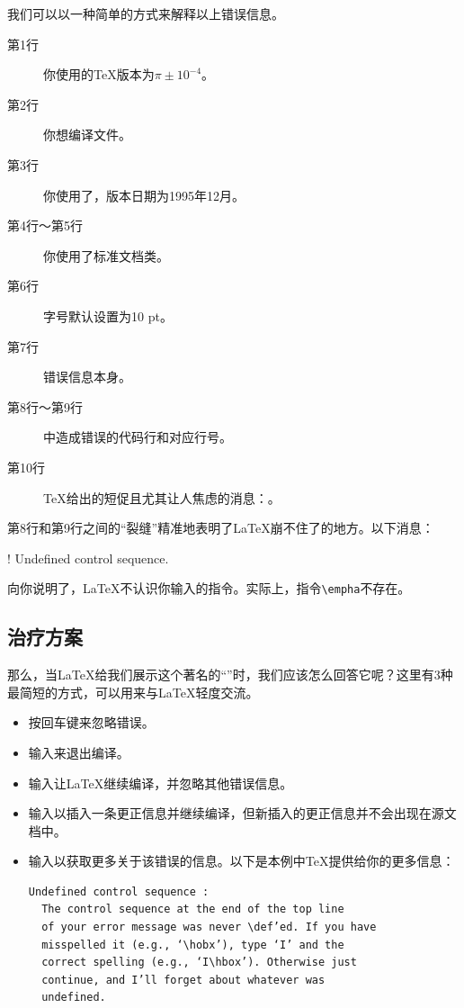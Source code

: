 我们可以以一种简单的方式来解释以上错误信息。

\begin{description}

\item[第1行]你使用的\TeX 版本为$\pi\pm 10^{-4}$。
\item[第2行]你想编译文件。
\item[第3行]你使用了\LaTeXe ，版本日期为1995年12月。
\item[第4行～第5行]你使用了标准文档类。
\item[第6行]字号默认设置为10 pt。
\item[第7行]错误信息本身。
\item[第8行～第9行]中造成错误的代码行和对应行号。
\item[第10行]\TeX 给出的短促且尤其让人焦虑的消息：。

\end{description}

第8行和第9行之间的“裂缝”精准地表明了\LaTeX 崩不住了的地方。以下消息：

\begin{dmd}
    ! Undefined control sequence.
\end{dmd}

向你说明了，\LaTeX 不认识你输入的指令。实际上，指令\verb|\empha|不存在。

\subsection*{治疗方案}

那么，当\LaTeX 给我们展示这个著名的“”时，我们应该怎么回答它呢？这里有3种最简短的方式，可以用来与\LaTeX 轻度交流。

\begin{itemize}
    \item 按回车键来忽略错误。
    \item 输入来退出编译。
    \item 输入让\LaTeX 继续编译，并忽略其他错误信息。
    \item 输入以插入一条更正信息并继续编译，但新插入的更正信息并不会出现在源文档中。
    \item 输入以获取更多关于该错误的信息。以下是本例中\TeX 提供给你的更多信息：\begin{verbatim}
Undefined control sequence :
  The control sequence at the end of the top line
  of your error message was never \def’ed. If you have
  misspelled it (e.g., ‘\hobx’), type ‘I’ and the
  correct spelling (e.g., ‘I\hbox’). Otherwise just
  continue, and I’ll forget about whatever was
  undefined.\end{verbatim}
\end{itemize}

